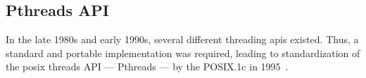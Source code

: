 \subsection{Pthreads API}
\label{sec:pthreads-api}
In the late 1980s and early 1990s, several different threading \gls{api}s
existed. Thus, a standard and portable implementation was required, leading to
standardization of the \gls{posix} threads API --- Pthreads --- by the POSIX.1c
in 1995~\cite{kerrisk2010linux}.


